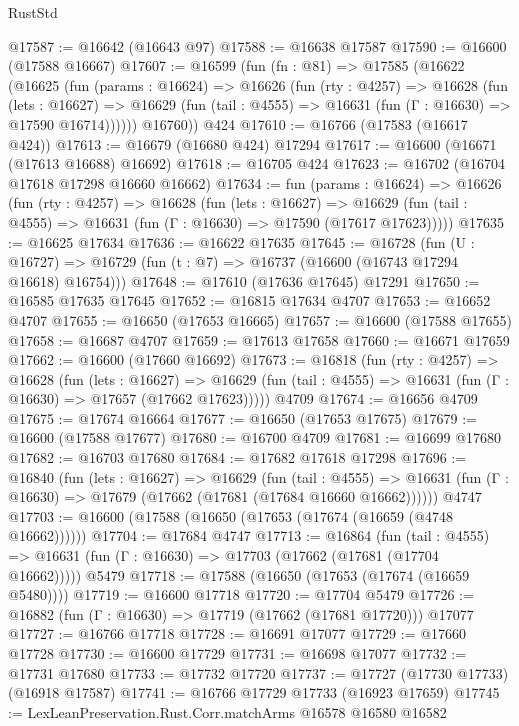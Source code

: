 \begin{lexlean}{RustStd}
\begin{coremodule}
@17587 := @16642 (@16643 @97)
@17588 := @16638 @17587
@17590 := @16600 (@17588 @16667)
@17607 := @16599
    (fun (fn : @81) =>
    @17585
      (@16622
        (@16625
          (fun (params : @16624) =>
          @16626
            (fun (rty : @4257) =>
            @16628
              (fun (lets : @16627) =>
              @16629 (fun (tail : @4555) => @16631 (fun (Γ : @16630) => @17590 @16714))))))
        @16760))
    @424
@17610 := @16766 (@17583 (@16617 @424))
@17613 := @16679 (@16680 @424) @17294
@17617 := @16600 (@16671 (@17613 @16688) @16692)
@17618 := @16705 @424
@17623 := @16702 (@16704 @17618 @17298 @16660 @16662)
@17634 := fun (params : @16624) =>
  @16626
    (fun (rty : @4257) =>
    @16628
      (fun (lets : @16627) =>
      @16629 (fun (tail : @4555) => @16631 (fun (Γ : @16630) => @17590 (@17617 @17623)))))
@17635 := @16625 @17634
@17636 := @16622 @17635
@17645 := @16728
    (fun (U : @16727) => @16729 (fun (t : @7) => @16737 (@16600 (@16743 @17294 @16618) @16754)))
@17648 := @17610 (@17636 @17645) @17291
@17650 := @16585 @17635 @17645
@17652 := @16815 @17634 @4707
@17653 := @16652 @4707
@17655 := @16650 (@17653 @16665)
@17657 := @16600 (@17588 @17655)
@17658 := @16687 @4707
@17659 := @17613 @17658
@17660 := @16671 @17659
@17662 := @16600 (@17660 @16692)
@17673 := @16818
    (fun (rty : @4257) =>
    @16628
      (fun (lets : @16627) =>
      @16629 (fun (tail : @4555) => @16631 (fun (Γ : @16630) => @17657 (@17662 @17623)))))
    @4709
@17674 := @16656 @4709
@17675 := @17674 @16664
@17677 := @16650 (@17653 @17675)
@17679 := @16600 (@17588 @17677)
@17680 := @16700 @4709
@17681 := @16699 @17680
@17682 := @16703 @17680
@17684 := @17682 @17618 @17298
@17696 := @16840
    (fun (lets : @16627) =>
    @16629
      (fun (tail : @4555) =>
      @16631 (fun (Γ : @16630) => @17679 (@17662 (@17681 (@17684 @16660 @16662))))))
    @4747
@17703 := @16600 (@17588 (@16650 (@17653 (@17674 (@16659 (@4748 @16662))))))
@17704 := @17684 @4747
@17713 := @16864
    (fun (tail : @4555) => @16631 (fun (Γ : @16630) => @17703 (@17662 (@17681 (@17704 @16662)))))
    @5479
@17718 := @17588 (@16650 (@17653 (@17674 (@16659 @5480))))
@17719 := @16600 @17718
@17720 := @17704 @5479
@17726 := @16882 (fun (Γ : @16630) => @17719 (@17662 (@17681 @17720))) @17077
@17727 := @16766 @17718
@17728 := @16691 @17077
@17729 := @17660 @17728
@17730 := @16600 @17729
@17731 := @16698 @17077
@17732 := @17731 @17680
@17733 := @17732 @17720
@17737 := @17727 (@17730 @17733) (@16918 @17587)
@17741 := @16766 @17729 @17733 (@16923 @17659)
@17745 := LexLeanPreservation.Rust.Corr.matchArms @16578 @16580 @16582

\end{coremodule}
\end{lexlean}

